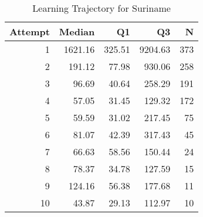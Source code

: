\begin{table}[htbp]
\centering
\caption{Learning Trajectory for Suriname}
\label{tab:learning-trajectory}
\begin{tabular}{rrrrr}
\toprule
Attempt & Median & Q1 & Q3 & N \\
\midrule
1 & 1621.16 & 325.51 & 9204.63 & 373 \\
2 & 191.12 & 77.98 & 930.06 & 258 \\
3 & 96.69 & 40.64 & 258.29 & 191 \\
4 & 57.05 & 31.45 & 129.32 & 172 \\
5 & 59.59 & 31.02 & 217.45 & 75 \\
6 & 81.07 & 42.39 & 317.43 & 45 \\
7 & 66.63 & 58.56 & 150.44 & 24 \\
8 & 78.37 & 34.78 & 127.59 & 15 \\
9 & 124.16 & 56.38 & 177.68 & 11 \\
10 & 43.87 & 29.13 & 112.97 & 10 \\
\bottomrule
\end{tabular}
\end{table}